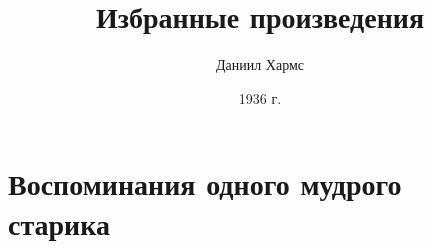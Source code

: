 \documentclass{article}
\begin{document}
\author{Даниил Хармс}
\title{Избранные произведения}
\date{1936 г.}

\maketitle
\section*{Воспоминания одного мудрого старика}

\end{document}
